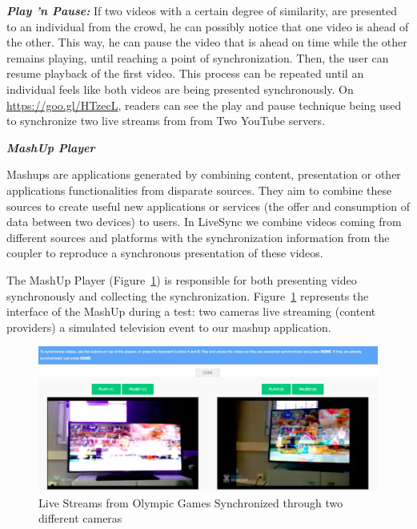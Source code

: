 \textbf{\textit{Play 'n Pause:}} If two videos with a certain degree of similarity, are presented to an individual from the crowd, he can possibly notice that one video is ahead of the other. This way, he can pause the video that is ahead on time while the other remains playing, until reaching a point of synchronization. Then, the user can resume playback of the first video. This process can be repeated until an individual feels like both videos are being presented synchronously. On \url{https://goo.gl/HTzecL}, readers can see the play and pause technique being used to synchronize two live streams from from Two YouTube servers.





\textbf{\textit{MashUp Player}}

Mashups are applications generated by combining content, presentation or other applications functionalities from disparate sources. They aim to combine these sources to create useful new applications or services (the offer and consumption of data between two devices) to users. In LiveSync we combine videos coming from different sources and platforms with the synchronization information from the coupler to reproduce a synchronous presentation of these videos.

The MashUp Player (Figure~\ref{live_tvs}) is responsible for both presenting video synchronously and collecting the synchronization. Figure~\ref{live_tvs} represents the interface of the MashUp during a test: two cameras live streaming (content providers) a simulated television event to our mashup application.

\begin{figure}[h]
	\centerline{\includegraphics[scale=0.2] {figure/screen}}
	\caption{Live Streams from Olympic Games Synchronized through two different cameras}
	\label{live_tvs}
\end{figure}

